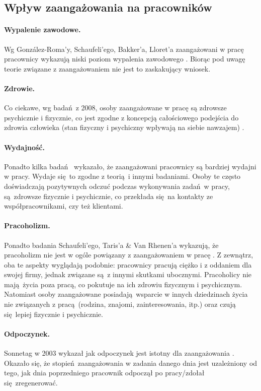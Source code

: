 \subsection{Wpływ zaangażowania na pracowników}
\paragraph{Wypalenie zawodowe.}
Wg González-Roma'y, Schaufeli'ego, Bakker'a, Lloret'a zaangażowani w pracę pracownicy wykazują niski poziom wypalenia zawodowego \citep{gonzlez2006burnout}. Biorąc pod uwagę teorie związane z zaangażowaniem nie jest to zaskakujący wniosek.
\paragraph{Zdrowie.}
Co ciekawe, wg badań z 2008, osoby zaangażowane w pracę są zdrowsze psychicznie i fizycznie, co jest zgodne z koncepcją całościowego podejścia do zdrowia człowieka (stan fizyczny i psychiczny wpływają na siebie nawzajem) \citep{schaufeli2008workaholism}.
\paragraph{Wydajność.}
Ponadto kilka badań \citep{xanthopoulou2008working,xanthopoulou2009work} wykazało, że zaangażowani pracownicy są bardziej wydajni w pracy. Wydaje się to zgodne z teorią i innymi badaniami. Osoby te często doświadczają pozytywnych odczuć podczas wykonywania zadań w pracy, są zdrowsze fizycznie i psychicznie, co przekłada się na kontakty ze współpracownikami, czy też klientami.
\paragraph{Pracoholizm.}
Ponadto badania Schaufeli'ego, Taris'a \& Van Rhenen'a wykazują, że pracoholizm nie jest w ogóle powiązany z zaangażowaniem w pracę \citep{schaufeli2008workaholism}. Z zewnątrz, oba te aspekty wyglądają podobnie: pracownicy pracują ciężko i z oddaniem dla swojej firmy, jednak związane są z innymi skutkami ubocznymi. Pracoholicy nie mają życia poza pracą, co pokutuje na ich zdrowiu fizycznym i psychicznym. Natomiast osoby zaangażowane posiadają wsparcie w innych dziedzinach życia nie związanych z pracą (rodzina,
znajomi, zainteresowania, itp.) oraz czują się lepiej fizycznie i psychicznie.
\paragraph{Odpoczynek.}
Sonnetag w 2003 wykazał jak odpoczynek jest istotny dla zaangażowania \citep{sonnentag2003recovery}. Okazało się, że stopień zaangażowania w zadania danego dnia jest uzależniony od tego, jak dnia poprzedniego pracownik odpoczął po pracy/zdołał się zregenerować.
